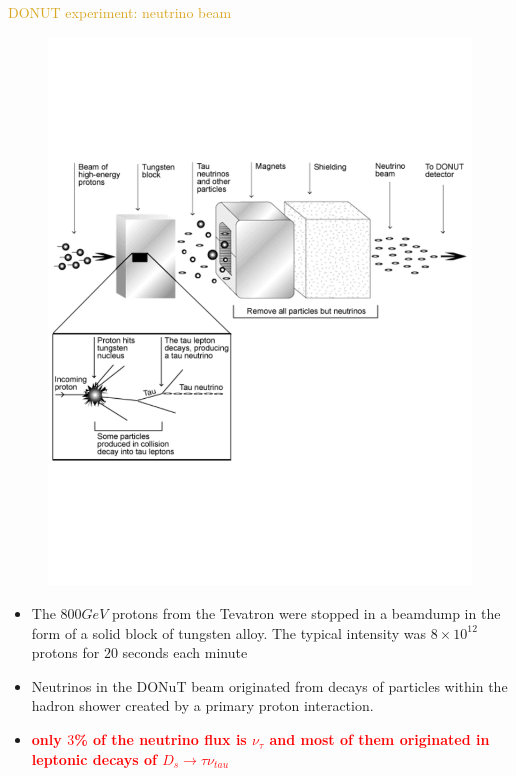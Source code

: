 \documentclass[11pt]{beamer} %
\renewcommand{\(}{\begin{columns}}
\renewcommand{\)}{\end{columns}}
\newcommand{\<}[1]{\begin{column}{#1}}
\renewcommand{\>}{\end{column}}
\newcommand{\itt}{\begin{itemize}}
\newcommand{\tti}{\end{itemize}}
\newcommand{\hlt}[2]{\textcolor{#1}{\textbf{#2}}}
\begin{document}
\begin{frame}{\textcolor{Goldenrod}{DONUT experiment: neutrino beam}}
  \begin{overlayarea}{\textwidth}{\textheight}
    \begin{figure}[h]
      \centering
      \includegraphics[height=0.4\textheight, width=0.6\linewidth]{./Images/DONUT02}
    \end{figure}
    
    \itt[<only@+>]
  \item The $800 GeV$ protons from the Tevatron were stopped in a
    beamdump in the form of a solid block of tungsten alloy. The
    typical intensity was $8 \times 10^{12}$ protons for $20$ seconds each minute
  \item Neutrinos in the DONuT beam originated from decays of
    particles within the hadron shower created by a primary proton
    interaction.
  \item \hlt{Red}{only $3$\% of the neutrino flux is $\nu_{\tau}$ and most of them originated
      in leptonic decays of $D_s \to \tau \nu_{tau}$}
    \tti
  \end{overlayarea}
\end{frame}
\end{document}
